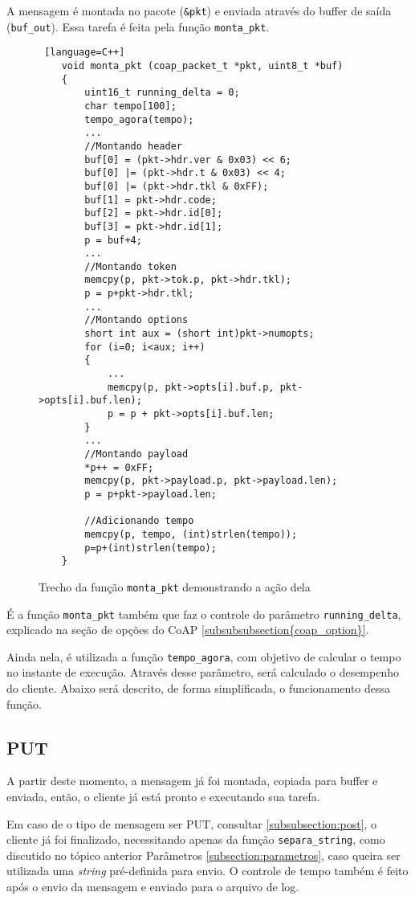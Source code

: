 A mensagem é montada no pacote (\texttt{\&pkt}) e enviada através do buffer de saída (\texttt{buf\_out}). Essa tarefa é feita pela função \texttt{monta\_pkt}.
\begin{figure}[!htb]
	\begin{lstlisting} [language=C++]
	void monta_pkt (coap_packet_t *pkt, uint8_t *buf)
	{
		uint16_t running_delta = 0;
		char tempo[100];
		tempo_agora(tempo);
		...
		//Montando header
		buf[0] = (pkt->hdr.ver & 0x03) << 6;
		buf[0] |= (pkt->hdr.t & 0x03) << 4;
		buf[0] |= (pkt->hdr.tkl & 0xFF);
		buf[1] = pkt->hdr.code;
		buf[2] = pkt->hdr.id[0];
		buf[3] = pkt->hdr.id[1];
		p = buf+4;
		...
		//Montando token
		memcpy(p, pkt->tok.p, pkt->hdr.tkl);
		p = p+pkt->hdr.tkl;
		...
		//Montando options
		short int aux = (short int)pkt->numopts;
		for (i=0; i<aux; i++)
		{
			...
			memcpy(p, pkt->opts[i].buf.p, pkt->opts[i].buf.len);
			p = p + pkt->opts[i].buf.len;
		}
		...
		//Montando payload
		*p++ = 0xFF;
		memcpy(p, pkt->payload.p, pkt->payload.len);
		p = p+pkt->payload.len;
		
		//Adicionando tempo
		memcpy(p, tempo, (int)strlen(tempo));
		p=p+(int)strlen(tempo);
	}
	\end{lstlisting}
	\caption{Trecho da função \texttt{monta\_pkt} demonstrando a ação dela}
	\label{code:montar_pkt}
\end{figure}

É a função \texttt{monta\_pkt} também que faz o controle do parâmetro \texttt{running\_delta}, explicado na seção de opções do CoAP \ref{subsubsubsection{coap_option}}.

Ainda nela, é utilizada a função \texttt{tempo\_agora}, com objetivo de calcular o tempo no instante de execução. Através desse parâmetro, será calculado o desempenho do cliente. Abaixo será descrito, de forma simplificada, o funcionamento dessa função.


\subsection{PUT}

A partir deste momento, a mensagem já foi montada, copiada para buffer e enviada, então, o cliente já está pronto e executando sua tarefa. 

Em caso de o tipo de mensagem ser PUT, consultar \ref{subsubsection:post}, o cliente já foi finalizado, necessitando apenas da função \texttt{separa\_string}, como discutido no tópico anterior Parâmetros \ref{subsection:parametros}, caso queira ser utilizada uma \textit{string} pré-definida para envio. O controle de tempo também é feito após o envio da mensagem e enviado para o arquivo de log.


